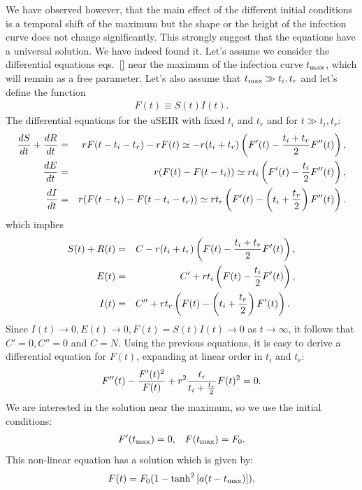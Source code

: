 \documentclass[a4paper,oneside,11pt]{article}
\begin{document}
   We have observed however, that the main effect of the different initial conditions is a temporal shift of the maximum but the shape or the height of the infection curve does not change significantly. This strongly suggest that the equations have a universal solution. We have indeed found it. Let's assume we consider the differential equations eqs.~\ref{} near the maximum of the infection curve $t_{\rm max}$, which will remain as a free parameter. Let's also assume that $t_{\rm max} \gg t_i, t_r$ and let's define the function
 \begin{eqnarray}
 F(t) \equiv S(t) I(t).
 \end{eqnarray} 
 The differential equations for the uSEIR with fixed $t_i$ and $t_r$ and for $t\gg t_i, t_r$:
 \begin{eqnarray}
 {d S \over dt}+{d R\over dt} &=& r F(t-t_i - t_r) - r F(t) \simeq -r (t_i+t_r) \left(F'(t)-{t_i+t_r\over 2} F''(t)\right), \nonumber\\
  {d E \over dt} &=& r (F(t) - F(t-t_i))  \simeq r t_i \left(F'(t)-{t_i\over 2} F''(t)\right) , \nonumber\\
   {d I \over dt} &=& r (F(t-t_i) - F(t-t_i-t_r))  \simeq r t_r \left(F'(t) - \left(t_i+{t_r\over 2}\right) F''(t)\right).
 \end{eqnarray}
 which implies
 \begin{eqnarray}
 S(t)+R(t) &=& C - r (t_i + t_r) \left(F(t)-{t_i+t_r\over 2} F'(t)\right), \nonumber\\
   E(t) &=& C' +r t_i \left( F(t)-{t_i\over 2} F'(t)\right), \nonumber\\
   I(t) &=& C'' +r t_r \left(F(t)-\left(t_i+{t_r\over 2}\right) F'(t)\right). \;\;
 \end{eqnarray}
 Since $I(t) \rightarrow 0, E(t)\rightarrow 0, F(t) = S(t) I(t) \rightarrow 0$ as $t\rightarrow \infty$, it follows that $C'=0, C''=0$ and $C= N$.
 Using the previous equations, it is easy to derive a differential equation for $F(t)$, expanding at linear order in $t_i$ and $t_r$:
  \begin{eqnarray}
 F''(t) - {F'(t)^2\over F(t)} + r^2 {t_r\over t_i+{t_r\over 2}} F(t)^2 = 0. 
 \end{eqnarray}
 We are interested in the solution near the maximum, so we use the initial conditions:
 \begin{eqnarray}
 F'(t_{\rm max}) = 0, \;\;\; F(t_{\rm max}) = F_0.
 \end{eqnarray}
 This non-linear equation has a solution which is given by:
\begin{eqnarray}
F(t) = F_0 \large(1 - \tanh^2\left[ a (t-t_{\rm max})\right]\large),
\label{eq:tanh}
\end{eqnarray} 
\end{document}
